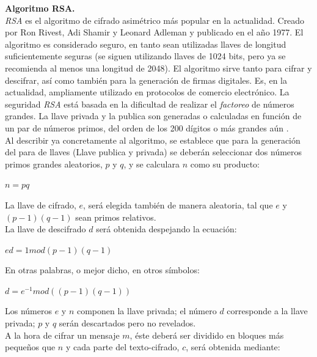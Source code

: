 \documentclass[12pt, a4paper, titlepage]{report}
\begin{document}
    		\textbf{Algoritmo RSA.}\\
    		\textit{RSA} es el algoritmo de cifrado asimétrico más popular en la actualidad. Creado por Ron Rivest, Adi Shamir y Leonard Adleman y publicado en el año 1977. El algoritmo es considerado seguro, en tanto sean utilizadas llaves de longitud suficientemente seguras (se siguen utilizando llaves de 1024 bits, pero ya se recomienda al menos una longitud de 2048). El algoritmo sirve tanto para cifrar y descifrar, así como también para la generación de firmas digitales. Es, en la actualidad, ampliamente utilizado en protocolos de comercio electrónico. La seguridad \textit{RSA} está basada en la dificultad de realizar el \textit{factoreo} de números grandes. La llave privada y la publica son generadas o calculadas en función de un par de números primos, del orden de los 200 dígitos o más grandes aún \cite{refCriptografia}. \\
    		Al describir ya concretamente al algoritmo, se establece que para la generación del para de llaves (Llave publica y privada) se deberán seleccionar dos números primos grandes aleatorios, $p$ y $q$, y se calculara $n$ como su producto:
    		
    		\begin{center}
    		    $n=pq$
    		\end{center}
    		
    		La llave de cifrado, $e$, será elegida también de manera aleatoria, tal que $e$ y $(p-1)(q-1)$ sean primos relativos.\\
    		La llave de descifrado $d$ será obtenida despejando la ecuación:
    		
    		\begin{center}
    		    $ed=1 mod (p-1)(q-1)$
    		\end{center}
    		
    		En otras palabras, o mejor dicho, en otros símbolos:
    		
    		\begin{center}
    		    $d=e^{-1} mod ((p-1)(q-1))$
    		\end{center}
		    
		    Los números $e$ y $n$ componen la llave privada; el número $d$ corresponde a la llave privada; $p$ y $q$ serán descartados pero no revelados.\\
		    A la hora de cifrar un mensaje $m$, éste deberá ser dividido en bloques más pequeños que $n$ y cada parte del texto-cifrado, $c$, será obtenida mediante:
		    
\end{document}
